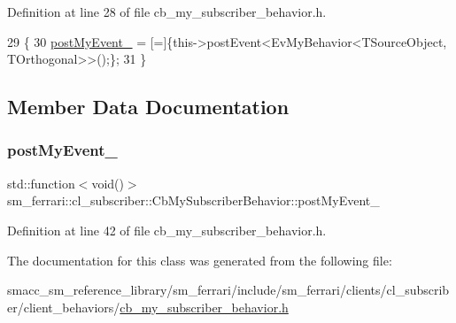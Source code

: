 Definition at line 28 of file cb\+\_\+my\+\_\+subscriber\+\_\+behavior.\+h.


\begin{DoxyCode}
29     \{
30         \hyperlink{classsm__ferrari_1_1cl__subscriber_1_1CbMySubscriberBehavior_a54dd6633b3105bd2b1d9432ed1462ff0}{postMyEvent\_} = [=]\{this->postEvent<EvMyBehavior<TSourceObject, TOrthogonal>>();\};
31     \}
\end{DoxyCode}


\subsection{Member Data Documentation}
\mbox{\label{classsm__ferrari_1_1cl__subscriber_1_1CbMySubscriberBehavior_a54dd6633b3105bd2b1d9432ed1462ff0}} 
\subsubsection{\texorpdfstring{post\+My\+Event\+\_\+}{postMyEvent\_}}
{\footnotesize\ttfamily std\+::function$<$void()$>$ sm\+\_\+ferrari\+::cl\+\_\+subscriber\+::\+Cb\+My\+Subscriber\+Behavior\+::post\+My\+Event\+\_\+}



Definition at line 42 of file cb\+\_\+my\+\_\+subscriber\+\_\+behavior.\+h.



The documentation for this class was generated from the following file\+:\begin{DoxyCompactItemize}
\item 
smacc\+\_\+sm\+\_\+reference\+\_\+library/sm\+\_\+ferrari/include/sm\+\_\+ferrari/clients/cl\+\_\+subscriber/client\+\_\+behaviors/\hyperlink{cb__my__subscriber__behavior_8h}{cb\+\_\+my\+\_\+subscriber\+\_\+behavior.\+h}\end{DoxyCompactItemize}

